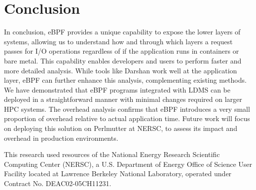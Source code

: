 \documentclass[sigconf]{acmart}
\begin{document}
\section{Conclusion} 
In conclusion, eBPF provides a unique capability to expose the lower layers of systems, allowing us to understand how and through which layers a request passes for I/O operations regardless of if the application runs in containers or bare metal. This capability enables developers and users to perform faster and more detailed analysis. While tools like Darshan work well at the application layer, eBPF can further enhance this analysis, complementing existing methods. We have demonstrated that eBPF programs integrated with LDMS can be deployed in a straightforward manner with minimal changes required on larger HPC systems. The overhead analysis confirms that eBPF introduces a very small proportion of overhead relative to actual application time. Future work will focus on deploying this solution on Perlmutter at NERSC, to assess its impact and overhead in production environments.
\begin{acks}
This research used resources of the National Energy Research
Scientific Computing Center (NERSC), a U.S. Department of Energy Office of Science User Facility located at Lawrence Berkeley National Laboratory, operated under Contract No. DEAC02-05CH11231.
\end{acks}




\end{document}
